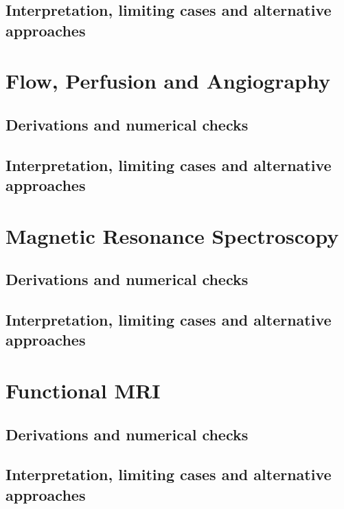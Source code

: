 \subsection{Interpretation, limiting cases and alternative approaches}
\par\pagebreak[1]

\section{Flow, Perfusion and Angiography}
\label{sec:e:flow-perfusion-and-angiography}
\subsection{Derivations and numerical checks}
\subsection{Interpretation, limiting cases and alternative approaches}
\par\pagebreak[1]

\section{Magnetic Resonance Spectroscopy}
\label{sec:e:magnetic-resonance-spectroscopy}
\subsection{Derivations and numerical checks}
\subsection{Interpretation, limiting cases and alternative approaches}
\par\pagebreak[1]

\section{Functional MRI}
\label{sec:e:functional-mri}
\subsection{Derivations and numerical checks}
\subsection{Interpretation, limiting cases and alternative approaches}
\par\pagebreak[1]

